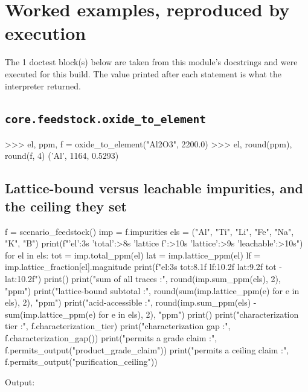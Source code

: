 \documentclass[10pt,a4paper,twoside]{report}
\begin{document}
\section{Worked examples, reproduced by execution}

The 1 doctest block(s) below are taken from this module's docstrings and were executed for this build. The value printed after each statement is what the interpreter returned.

\subsection*{\texttt{core.feedstock.oxide\_to\_element}}

\begin{doctestblock}
>>> el, ppm, f = oxide_to_element("Al2O3", 2200.0)
>>> el, round(ppm), round(f, 4)
('Al', 1164, 0.5293)
\end{doctestblock}

\subsection*{Lattice-bound versus leachable impurities, and the ceiling they set}

\begin{doctestblock}
f = scenario_feedstock()
imp = f.impurities
els = ("Al", "Ti", "Li", "Fe", "Na", "K", "B")
print(f"{'el':3s} {'total':>8s} {'lattice f':>10s} {'lattice':>9s} {'leachable':>10s}")
for el in els:
    tot = imp.total_ppm(el)
    lat = imp.lattice_ppm(el)
    lf = imp.lattice_fraction[el].magnitude
    print(f"{el:3s} {tot:8.1f} {lf:10.2f} {lat:9.2f} {tot - lat:10.2f}")
print()
print("sum of all traces       :", round(imp.sum_ppm(els), 2), "ppm")
print("lattice-bound subtotal  :",
      round(sum(imp.lattice_ppm(e) for e in els), 2), "ppm")
print("acid-accessible         :",
      round(imp.sum_ppm(els) - sum(imp.lattice_ppm(e) for e in els), 2), "ppm")
print()
print("characterization tier   :", f.characterization_tier)
print("characterization gap    :", f.characterization_gap())
print("permits a grade claim   :", f.permits_output("product_grade_claim"))
print("permits a ceiling claim :", f.permits_output("purification_ceiling"))
\end{doctestblock}

{\footnotesize\color{slate}Output:\par}
\end{document}
